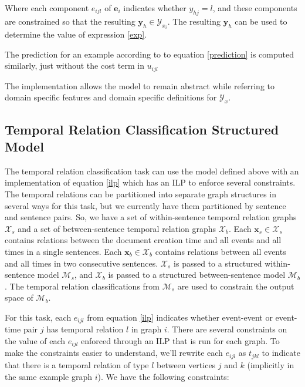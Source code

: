 \documentclass[11pt,letterpaper]{article}
\begin{document}
Where each component $e_{ijl}$ of $\mathbf{e}_i$ indicates whether 
$y_{hj}=l$, and these components are constrained so that the resulting 
$\mathbf{y}_h\in\mathcal{Y}_{x_i}$.  The resulting $\mathbf{y}_h$ can be
used to determine the value of expression \ref{exp}.

The prediction for an example according to to equation \ref{prediction} is computed 
similarly, just without the cost term in $u_{ijl}$

The implementation allows the model to remain abstract while referring to 
domain specific features and domain specific definitions for $\mathcal{Y}_x$.

\subsection{Temporal Relation Classification Structured Model}

The temporal relation classification task can use the model defined above 
with an implementation of equation \ref{ilp} which has an ILP to enforce several 
constraints.  The temporal relations can be partitioned into separate graph 
structures in several ways for this task, but we currently have them 
partitioned by sentence and sentence pairs.  So, we have a set of 
within-sentence temporal relation graphs $\mathcal{X}_s$ and a set of 
between-sentence temporal relation graphs $\mathcal{X}_b$.  Each 
$\mathbf{x}_s\in\mathcal{X}_s$ contains relations between the document 
creation time and all events and all times in a single sentences.  
Each $\mathbf{x}_b\in\mathcal{X}_b$ contains relations between all events 
and all times in two consecutive sentences. $\mathcal{X}_s$ is passed to 
a structured within-sentence model $\mathcal{M}_s$, and $\mathcal{X}_b$ is 
passed to a structured between-sentence model $\mathcal{M}_b$.  The temporal 
relation classifications from $\mathcal{M}_s$ are used to constrain the 
output space of $\mathcal{M}_b$.

For this task, each $e_{ijl}$ from equation \ref{ilp} indicates whether 
event-event or event-time pair $j$ has temporal relation $l$ in graph $i$.  
There are several constraints on the value of each $e_{ijl}$ enforced through 
an ILP that is run for each graph.  To make the constraints easier to 
understand, we'll rewrite each $e_{ijl}$ as $t_{jkl}$ to indicate that there 
is a temporal relation of type $l$ between vertices $j$ and $k$ (implicitly 
in the same example graph $i$).  We have the following constraints:
\end{document}
